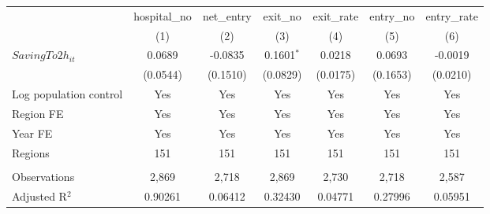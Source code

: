 \begingroup
\centering
\begin{tabular}{lcccccc}
   \toprule
                          & hospital\_no  & net\_entry  & exit\_no     & exit\_rate  & entry\_no  & entry\_rate \\    
                          & (1)           & (2)         & (3)          & (4)         & (5)        & (6)\\  
   \midrule 
   $SavingTo2h_{it}$      & 0.0689        & -0.0835     & 0.1601$^{*}$ & 0.0218      & 0.0693     & -0.0019\\   
                          & (0.0544)      & (0.1510)    & (0.0829)     & (0.0175)    & (0.1653)   & (0.0210)\\   
   Log population control & Yes           & Yes         & Yes          & Yes         & Yes        & Yes\\  
   Region FE              & Yes           & Yes         & Yes          & Yes         & Yes        & Yes\\  
   Year FE                & Yes           & Yes         & Yes          & Yes         & Yes        & Yes\\  
   Regions                & 151           & 151         & 151          & 151         & 151        & 151\\  
    \\
   Observations           & 2,869         & 2,718       & 2,869        & 2,730       & 2,718      & 2,587\\  
   Adjusted R$^2$         & 0.90261       & 0.06412     & 0.32430      & 0.04771     & 0.27996    & 0.05951\\  
   \bottomrule
\end{tabular}
\par\endgroup

